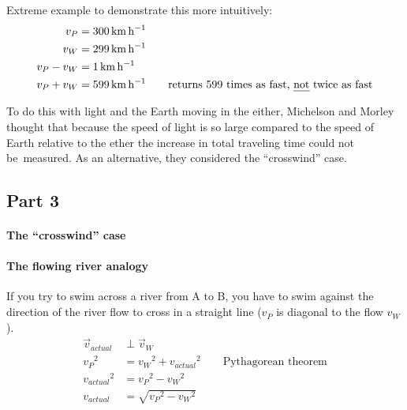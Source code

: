 \documentclass[pagesize,headsepline,10pt,parskip=half]{scrreprt}
\begin{document}
          \begin{samepage}
            Extreme example to demonstrate this more intuitively:
            \begin{align*}
              v_P &= \SI{300}{\kilo\meter\per\hour}\\
              v_W &= \SI{299}{\kilo\meter\per\hour}\\
              v_P - v_W &= \SI{1}{\kilo\meter\per\hour}\\
              v_P + v_W &= \SI{599}{\kilo\meter\per\hour} \qquad \text{returns 599 times as fast, \emph{not} twice as fast}
            \end{align*}
          \end{samepage}

          To do this with light and the Earth moving in the either, Michelson and Morley
          thought that because the speed of light is so large compared to the speed
          of Earth relative to the ether the increase in total traveling time could not
          be~measured.  As an alternative, they considered the “crosswind” case.

      \subsection{Part 3}
        \paragraph{The “crosswind” case}
        \paragraph{The flowing river analogy}
          If you try to swim across a river from A to B, you have to swim against
          the direction of the river flow to cross in a straight line ($v_P$ is
          diagonal to the flow $v_W$).
          \begin{align*}
            \vec{v}_{actual} &\perp \vec{v}_W\\
            {v_P}^2 &= {v_W}^2 + {v_{actual}}^2 \qquad \text{Pythagorean theorem}\\
            {v_{actual}}^2 &= {v_P}^2 - {v_W}^2\\
            v_{actual} &= \sqrt{{v_P}^2 - {v_W}^2}
          \end{align*}
\end{document}
